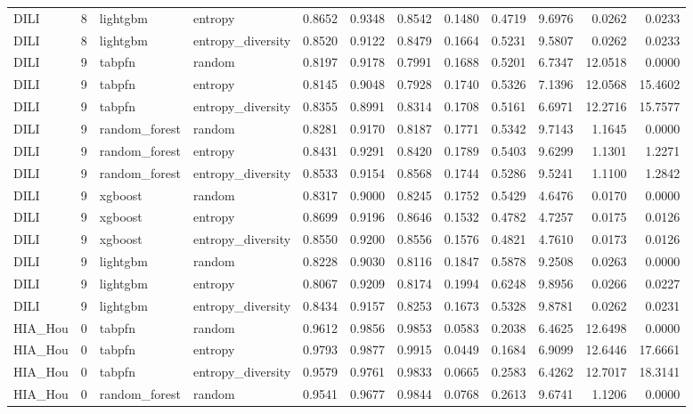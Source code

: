 \begin{tabular}{lrllrrrrrrrr}
DILI & 8 & lightgbm & entropy & 0.8652 & 0.9348 & 0.8542 & 0.1480 & 0.4719 & 9.6976 & 0.0262 & 0.0233 \\
DILI & 8 & lightgbm & entropy_diversity & 0.8520 & 0.9122 & 0.8479 & 0.1664 & 0.5231 & 9.5807 & 0.0262 & 0.0233 \\
DILI & 9 & tabpfn & random & 0.8197 & 0.9178 & 0.7991 & 0.1688 & 0.5201 & 6.7347 & 12.0518 & 0.0000 \\
DILI & 9 & tabpfn & entropy & 0.8145 & 0.9048 & 0.7928 & 0.1740 & 0.5326 & 7.1396 & 12.0568 & 15.4602 \\
DILI & 9 & tabpfn & entropy_diversity & 0.8355 & 0.8991 & 0.8314 & 0.1708 & 0.5161 & 6.6971 & 12.2716 & 15.7577 \\
DILI & 9 & random_forest & random & 0.8281 & 0.9170 & 0.8187 & 0.1771 & 0.5342 & 9.7143 & 1.1645 & 0.0000 \\
DILI & 9 & random_forest & entropy & 0.8431 & 0.9291 & 0.8420 & 0.1789 & 0.5403 & 9.6299 & 1.1301 & 1.2271 \\
DILI & 9 & random_forest & entropy_diversity & 0.8533 & 0.9154 & 0.8568 & 0.1744 & 0.5286 & 9.5241 & 1.1100 & 1.2842 \\
DILI & 9 & xgboost & random & 0.8317 & 0.9000 & 0.8245 & 0.1752 & 0.5429 & 4.6476 & 0.0170 & 0.0000 \\
DILI & 9 & xgboost & entropy & 0.8699 & 0.9196 & 0.8646 & 0.1532 & 0.4782 & 4.7257 & 0.0175 & 0.0126 \\
DILI & 9 & xgboost & entropy_diversity & 0.8550 & 0.9200 & 0.8556 & 0.1576 & 0.4821 & 4.7610 & 0.0173 & 0.0126 \\
DILI & 9 & lightgbm & random & 0.8228 & 0.9030 & 0.8116 & 0.1847 & 0.5878 & 9.2508 & 0.0263 & 0.0000 \\
DILI & 9 & lightgbm & entropy & 0.8067 & 0.9209 & 0.8174 & 0.1994 & 0.6248 & 9.8956 & 0.0266 & 0.0227 \\
DILI & 9 & lightgbm & entropy_diversity & 0.8434 & 0.9157 & 0.8253 & 0.1673 & 0.5328 & 9.8781 & 0.0262 & 0.0231 \\
HIA_Hou & 0 & tabpfn & random & 0.9612 & 0.9856 & 0.9853 & 0.0583 & 0.2038 & 6.4625 & 12.6498 & 0.0000 \\
HIA_Hou & 0 & tabpfn & entropy & 0.9793 & 0.9877 & 0.9915 & 0.0449 & 0.1684 & 6.9099 & 12.6446 & 17.6661 \\
HIA_Hou & 0 & tabpfn & entropy_diversity & 0.9579 & 0.9761 & 0.9833 & 0.0665 & 0.2583 & 6.4262 & 12.7017 & 18.3141 \\
HIA_Hou & 0 & random_forest & random & 0.9541 & 0.9677 & 0.9844 & 0.0768 & 0.2613 & 9.6741 & 1.1206 & 0.0000 \\

\end{tabular}
